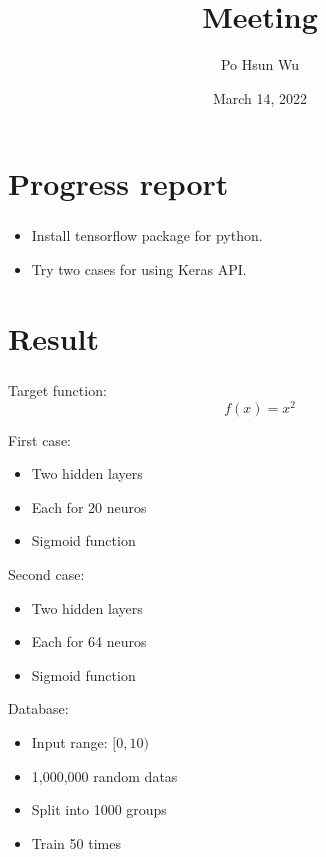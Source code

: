 \documentclass{beamer}
\date{March 14, 2022}
\title{Meeting}
\author{Po Hsun Wu}
\begin{document}
    \maketitle

    \section{Progress report}

    \begin{frame}
        \frametitle{\secname}

        \begin{itemize}
            \item Install tensorflow package for python.
            \item Try two cases for using Keras API.
        \end{itemize}

    \end{frame}

    \section{Result}

    \begin{frame}
        \frametitle{\secname}

        Target function:
        $$f(x)=x^2$$

        \begin{multicols}{2}
            First case:
            \begin{itemize}
                \item Two hidden layers
                \item Each for 20 neuros
                \item Sigmoid function
            \end{itemize}

            Second case:
            \begin{itemize}
                \item Two hidden layers
                \item Each for 64 neuros
                \item Sigmoid function
            \end{itemize}
            \columnbreak

            Database:
            \begin{itemize}
                \item Input range: $[0,10)$
                \item 1,000,000 random datas
                \item Split into 1000 groups
                \item Train 50 times
            \end{itemize}
        \end{multicols}
    \end{frame}
\end{document}
